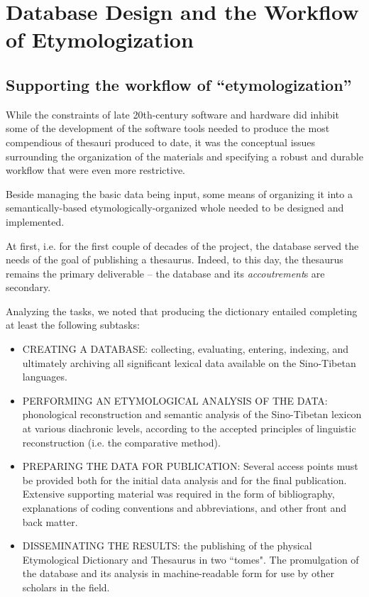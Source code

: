 \section{Database Design and the Workflow of Etymologization}

\subsection{Supporting the workflow of ``etymologization''}
While the constraints of late 20th-century software and hardware did inhibit some of
the development of the software tools needed to produce the most
compendious of thesauri produced to date, it was the conceptual issues
surrounding the organization of the materials and specifying a robust
and durable workflow that were even more restrictive.  

Beside managing the basic data being input, some means of organizing
it into a semantically-based etymologically-organized whole needed to
be designed and implemented. 

At first, i.e. for the first couple of decades of the project, the
database served the needs of the goal of publishing a
thesaurus. Indeed, to this day, the thesaurus remains the primary
deliverable -- the database and its {\it accoutrement}s are secondary.

Analyzing the tasks, we noted that producing the dictionary entailed completing at least the following
subtasks:
\begin{itemize}
\item  CREATING A DATABASE:  collecting, evaluating, entering, indexing, and ultimately archiving all significant lexical data available on the Sino-Tibetan languages.
\item  PERFORMING AN ETYMOLOGICAL ANALYSIS OF THE DATA: phonological reconstruction and semantic analysis of the Sino-Tibetan lexicon at various diachronic levels, according to the accepted principles of linguistic reconstruction (i.e. the comparative method).
\item  PREPARING THE DATA FOR PUBLICATION: Several access points must be provided both for the initial data analysis and for the final publication.  Extensive supporting material was required in the form of bibliography, explanations of coding conventions and abbreviations, and other front and back matter.
\item  DISSEMINATING THE RESULTS: the publishing of the physical Etymological Dictionary and
  Thesaurus in two ``tomes".  The promulgation of the database and its
  analysis in machine-readable form for use by other
  scholars in the field.
\end{itemize}


